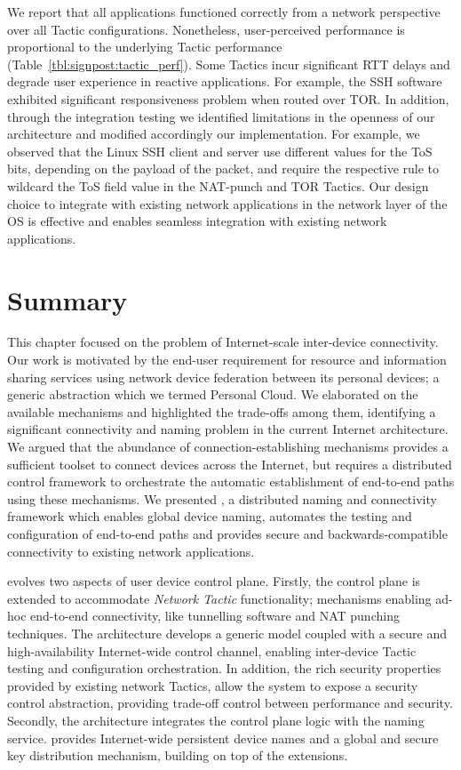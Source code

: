 We report that all applications functioned correctly from a network perspective
over all Tactic configurations. Nonetheless, user-perceived performance is
proportional to the underlying Tactic performance
(Table~\ref{tbl:signpost:tactic_perf}).  Some Tactics incur significant RTT
delays and degrade user experience in reactive applications. For example,
the SSH software exhibited significant responsiveness problem when routed over
TOR\@. In addition, through the integration testing we identified limitations
in the openness of our architecture and modified accordingly our
implementation. For example, we observed that the Linux SSH client and server
use different values for the ToS bits, depending on the payload of the packet,
and require the respective \of rule to wildcard the ToS field value in the
NAT-punch and TOR Tactics. Our design choice to integrate \signpost with
existing network applications in the network layer of the OS is effective and
enables seamless integration with existing network applications.

\section{Summary} \label{sec:signpost-conclusion}

This chapter focused on the problem of Internet-scale inter-device connectivity.
Our work is motivated by the end-user requirement for resource and information
sharing services using network device federation between its personal devices; a
generic abstraction which we termed Personal Cloud. We elaborated on the available
mechanisms and highlighted the trade-offs among them, identifying
a significant connectivity and naming problem in the current Internet
architecture.  We argued that the abundance of connection-establishing mechanisms
provides a sufficient toolset to connect devices across the Internet, but
requires a distributed control framework to orchestrate the automatic
establishment of end-to-end paths using these mechanisms. We presented \signpost,
a distributed naming and connectivity framework which enables global device
naming,  automates the testing and  configuration of end-to-end paths and
provides secure and backwards-compatible connectivity to existing network
applications. 

\signpost evolves two aspects of user device control plane. Firstly, the control
plane is extended to accommodate \textit{Network Tactic} functionality;
mechanisms enabling ad-hoc end-to-end connectivity, like tunnelling software and
NAT punching techniques. The architecture develops a generic model coupled with
a secure and high-availability Internet-wide control channel, enabling
inter-device Tactic testing and configuration orchestration.  In addition, the
rich security properties provided by existing network Tactics, allow the system
to expose a security control abstraction, providing trade-off control between
performance and security.  Secondly, the architecture integrates the control
plane logic with the naming service. \signpost provides Internet-wide
persistent device names and a global and secure key distribution mechanism,
building on top of the \dnssec extensions.

